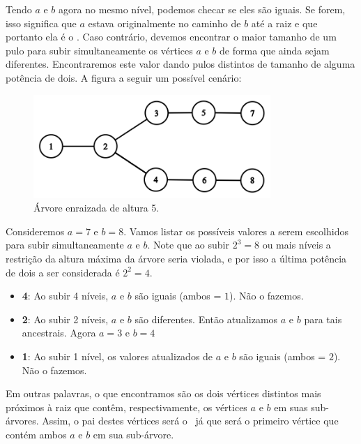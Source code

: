 Tendo $a$ e $b$ agora no mesmo nível, podemos checar se eles são iguais. Se forem, isso significa que $a$ estava originalmente no caminho de $b$ até a raiz e que portanto ela é o \LCA. Caso contrário, devemos encontrar o maior tamanho de um pulo para subir simultaneamente os vértices $a$ e $b$ de forma que ainda sejam diferentes. Encontraremos este valor dando pulos distintos de tamanho de alguma potência de dois. A figura a seguir um possível cenário:

\begin{figure}[htb]
\begin{center}
\includegraphics[width=9cm]{images/graph_dp2.png}
\end{center}
\caption{\label{fig:arvore-5}Árvore enraizada de altura 5.}
\end{figure}


Consideremos $a = 7$ e $b = 8$. Vamos listar os possíveis valores a serem escolhidos para subir simultaneamente $a$ e $b$. Note que ao subir $2^3 = 8$ ou mais níveis a restrição da altura máxima da árvore seria violada, e por isso a última potência de dois a ser considerada é $2^2 = 4$.

\begin{itemize}
    \item \textbf{4}: Ao subir 4 níveis, $a$ e $b$ são iguais (ambos = $1$). Não o fazemos.
    \item \textbf{2}: Ao subir 2 níveis, $a$ e $b$ são diferentes. Então atualizamos $a$ e $b$ para tais ancestrais. Agora $a = 3$ e $b = 4$
    \item \textbf{1}: Ao subir 1 nível, os valores atualizados de $a$ e $b$ são iguais (ambos = $2$). Não o fazemos.
\end{itemize}

Em outras palavras, o que encontramos são os dois vértices distintos mais próximos à raiz que contêm, respectivamente, os vértices $a$ e $b$ em suas sub-árvores. Assim, o pai destes vértices será o \LCA\, já que será o primeiro vértice que contém ambos $a$ e $b$ em sua sub-árvore.

\vspace{1cm}

